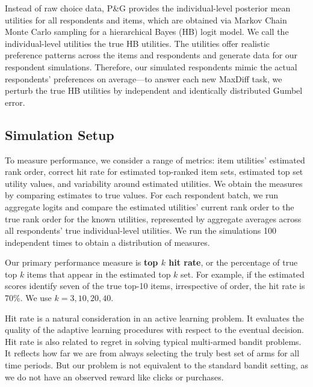 \documentclass[nonblindrev]{informs3}
\begin{document}
Instead of raw choice data, P\&G provides the individual-level posterior mean utilities for all respondents and items, which are obtained via Markov Chain Monte Carlo sampling for a hierarchical Bayes (HB) logit model. We call the individual-level utilities the true HB utilities. The utilities offer realistic preference patterns across the items and respondents and generate data for our respondent simulations.  Therefore, our simulated respondents mimic the actual respondents' preferences on average---to answer each new MaxDiff task, we perturb the true HB utilities by independent and identically distributed Gumbel error.

\subsection{Simulation Setup}
To measure performance, we consider a range of metrics: item utilities' estimated rank order, correct hit rate for estimated top-ranked item sets, estimated top set utility values, and variability around estimated utilities. We obtain the measures by comparing estimates to true values. For each respondent batch, we run aggregate logits and compare the estimated utilities' current rank order to the true rank order for the known utilities, represented by aggregate averages across all respondents' true individual-level utilities. We run the simulations 100 independent times to obtain a distribution of measures. 

Our primary performance measure is \textbf{top $k$ hit rate}, or the percentage of true top $k$ items that appear in the estimated top $k$ set. For example, if the estimated scores identify seven of the true top-10 items, irrespective of order, the hit rate is 70\%. We use $k=3,10,20,40$. 

Hit rate is a natural consideration in an active learning problem. It evaluates the quality of the adaptive learning procedures with respect to the eventual decision. Hit rate is also related to regret in solving typical multi-armed bandit problems. It reflects how far we are from always selecting the truly best set of arms for all time periods. But our problem is not equivalent to the standard bandit setting, as we do not have an observed reward like clicks or purchases. 
\end{document}
